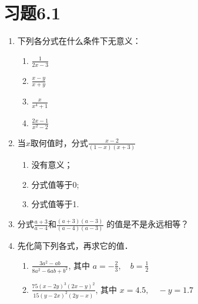\section*{习题6.1}
\begin{enumerate}
    \item 下列各分式在什么条件下无意义：
 \begin{multicols}{2}
 \begin{enumerate}
     \item $\frac{1}{2x-3}$
     \item $\frac{x-y}{x+y}$
     \item $\frac{x}{x^4+1}$
     \item $\frac{2x-1}{x^2-2}$
 \end{enumerate}
 \end{multicols}
    \item 当$x$取何值时，分式$\frac{x-2}{(1-x)(x+3)}$
    \begin{enumerate}
        \item 没有意义；
        \item 分式值等于0;
        \item 分式值等于1.
    \end{enumerate}
\item 分式$\frac{a+3}{a-4}$和$\frac{(a+3)(a-3)}{(a-4)(a-3)}$
的值是不是永远相等？
\item 先化简下列各式，再求它的值．
\begin{enumerate}
    \item $\frac{3 a^{2}-a b}{8 a^{2}-6 a b+b^{2}}$, 其中 $a=- \frac{2}{3}, \quad b=\frac{1}{2}$
    \item  $\frac{75(x-2 y)^{3}(2 x-y)^{2}}{15(y-2 x)^{2}(2 y-x)}$, 其中 $x=4.5,\quad -y=1.7$
\end{enumerate}


\end{enumerate}
